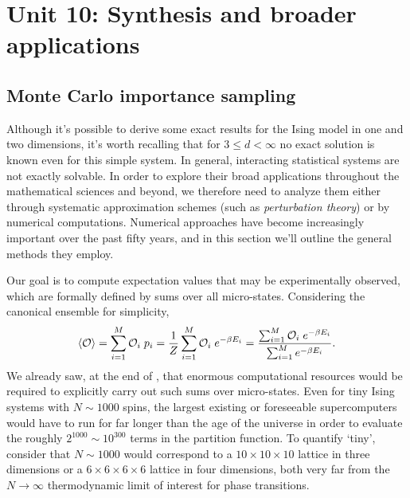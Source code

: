 \renewcommand{\thisunit}{MATH327 Unit 10}
\renewcommand{\moddate}{Last modified 21 May 2023}
\setcounter{section}{10}
\setcounter{subsection}{0}
{}
\section*{Unit 10: Synthesis and broader applications} %
\subsection{\label{sec:MonteCarlo}Monte Carlo importance sampling}
Although it's possible to derive some exact results for the Ising model in one and two dimensions, it's worth recalling that for $3 \leq d < \infty$ no exact solution is known even for this simple system.
In general, interacting statistical systems are not exactly solvable.
In order to explore their broad applications throughout the mathematical sciences and beyond, we therefore need to analyze them either through systematic approximation schemes (such as \emph{perturbation theory}) or by numerical computations.
Numerical approaches have become increasingly important over the past fifty years, and in this section we'll outline the general methods they employ.

Our goal is to compute expectation values that may be experimentally observed, which are formally defined by sums over all micro-states.
Considering the canonical ensemble for simplicity,
\begin{equation*}
  \left\langle \mathcal O \right\rangle = \sum_{i = 1}^M \mathcal O_i \; p_i = \frac{1}{Z} \sum_{i = 1}^M \mathcal O_i \; e^{-\beta E_i} = \frac{\sum_{i = 1}^M \mathcal O_i \; e^{-\beta E_i}}{\sum_{i = 1}^M e^{-\beta E_i}}.
\end{equation*}
We already saw, at the end of , that enormous computational resources would be required to explicitly carry out such sums over micro-states.
Even for tiny Ising systems with $N \sim 1000$ spins, the largest existing or foreseeable supercomputers would have to run for far longer than the age of the universe in order to evaluate the roughly $2^{1000} \sim 10^{300}$ terms in the partition function.
To quantify `tiny', consider that $N \sim 1000$ would correspond to a $10\times 10\times 10$ lattice in three dimensions or a $6\times 6\times 6\times 6$ lattice in four dimensions, both very far from the $N \to \infty$ thermodynamic limit of interest for phase transitions.

